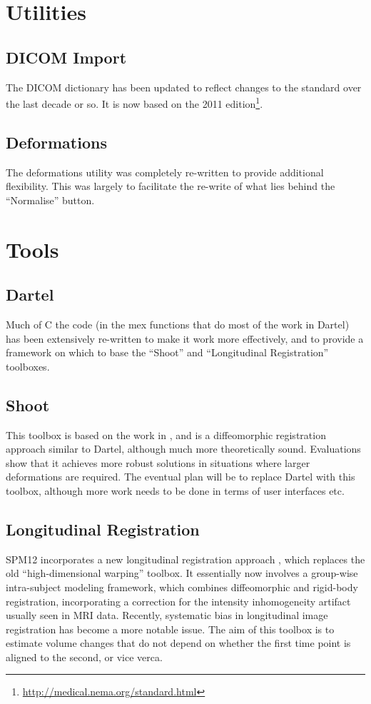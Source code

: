 \documentclass[a4paper,titlepage,openany]{article}
\begin{document}
\begin{multicols}{2}
\section{Utilities}

\subsection{DICOM Import}
The DICOM dictionary has been updated to reflect changes to the standard over the last decade or so.
It is now based on the 2011 edition\footnote{\url{http://medical.nema.org/standard.html}}.

\subsection{Deformations}
The deformations utility was completely re-written to provide additional flexibility.
This was largely to facilitate the re-write of what lies behind the ``Normalise'' button.

\section{Tools}

\subsection{Dartel}
Much of C the code (in the mex functions that do most of the work in Dartel) has been extensively re-written to make it work more effectively, and to provide a framework on which to base the ``Shoot'' and ``Longitudinal Registration'' toolboxes.

\subsection{Shoot}
This toolbox is based on the work in \cite{ashburner2011diffeomorphic}, and is a diffeomorphic registration approach similar to Dartel, although much more theoretically sound.
Evaluations show that it achieves more robust solutions in situations where larger deformations are required.
The eventual plan will be to replace Dartel with this toolbox, although more work needs to be done in terms of user interfaces etc.

\subsection{Longitudinal Registration}
SPM12 incorporates a new longitudinal registration approach \cite{ashburner2013symmetric}, which replaces the old ``high-dimensional warping'' toolbox.
It essentially now involves a group-wise intra-subject modeling framework, which combines diffeomorphic \cite{ashburner2011diffeomorphic} and rigid-body registration, incorporating a correction for the intensity inhomogeneity artifact usually seen in MRI data.
Recently, systematic bias in longitudinal image registration has become a more notable issue.
The aim of this toolbox is to estimate volume changes that do not depend on whether the first time point is aligned to the second, or vice verca.


\end{multicols}
\end{document}
